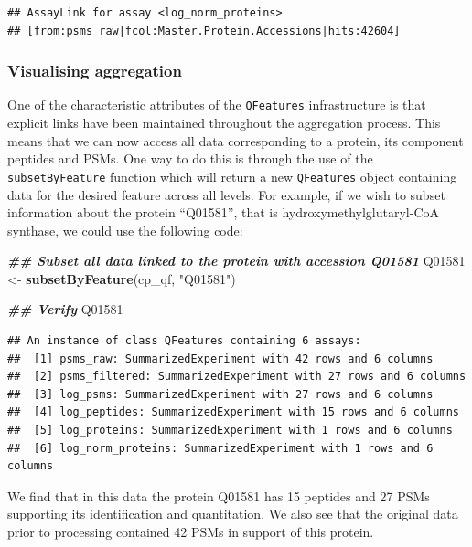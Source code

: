 \documentclass[9pt,a4paper,]{extarticle}
\newenvironment{Shaded}{\begin{snugshade}}{\end{snugshade}}
\newcommand{\DocumentationTok}[1]{\textcolor[rgb]{0.56,0.35,0.01}{\textbf{\textit{#1}}}}
\newcommand{\FunctionTok}[1]{\textcolor[rgb]{0.13,0.29,0.53}{\textbf{#1}}}
\newcommand{\NormalTok}[1]{#1}
\newcommand{\OtherTok}[1]{\textcolor[rgb]{0.56,0.35,0.01}{#1}}
\newcommand{\StringTok}[1]{\textcolor[rgb]{0.31,0.60,0.02}{#1}}
\begin{document}
\begin{verbatim}
## AssayLink for assay <log_norm_proteins>
## [from:psms_raw|fcol:Master.Protein.Accessions|hits:42604]
\end{verbatim}

\subsubsection{Visualising aggregation}\label{visualising-aggregation}

One of the characteristic attributes of the \texttt{QFeatures} infrastructure is that
explicit links have been maintained throughout the aggregation process. This
means that we can now access all data corresponding to a protein, its component
peptides and PSMs. One way to do this is through the use of the
\texttt{subsetByFeature} function which will return a new \texttt{QFeatures} object containing
data for the desired feature across all levels. For example, if we wish to
subset information about the protein ``Q01581'', that is hydroxymethylglutaryl-CoA
synthase, we could use the following code:

\begin{Shaded}
\begin{Highlighting}[]
\DocumentationTok{\#\# Subset all data linked to the protein with accession Q01581}
\NormalTok{Q01581 }\OtherTok{\textless{}{-}} \FunctionTok{subsetByFeature}\NormalTok{(cp\_qf, }\StringTok{"Q01581"}\NormalTok{)}

\DocumentationTok{\#\# Verify}
\NormalTok{Q01581}
\end{Highlighting}
\end{Shaded}

\begin{verbatim}
## An instance of class QFeatures containing 6 assays:
##  [1] psms_raw: SummarizedExperiment with 42 rows and 6 columns 
##  [2] psms_filtered: SummarizedExperiment with 27 rows and 6 columns 
##  [3] log_psms: SummarizedExperiment with 27 rows and 6 columns 
##  [4] log_peptides: SummarizedExperiment with 15 rows and 6 columns 
##  [5] log_proteins: SummarizedExperiment with 1 rows and 6 columns 
##  [6] log_norm_proteins: SummarizedExperiment with 1 rows and 6 columns
\end{verbatim}

We find that in this data the protein Q01581 has 15
peptides and 27 PSMs supporting its identification
and quantitation. We also see that the original data prior to processing contained
42 PSMs in support of this protein.
\end{document}
